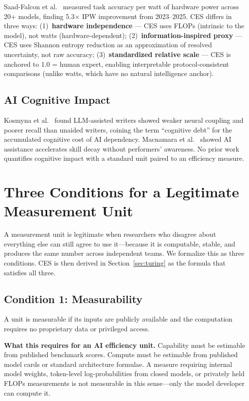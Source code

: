 \documentclass[12pt]{article}
\begin{document}
Saad-Falcon et al.\ \cite{saadfalcon2024} measured task accuracy per watt of hardware power across 20+ models, finding 5.3$\times$ IPW improvement from 2023--2025. CES differs in three ways: (1)~\textbf{hardware independence} --- CES uses FLOPs (intrinsic to the model), not watts (hardware-dependent); (2)~\textbf{information-inspired proxy} --- CES uses Shannon entropy reduction as an approximation of resolved uncertainty, not raw accuracy; (3)~\textbf{standardized relative scale} --- CES is anchored to 1.0 = human expert, enabling interpretable protocol-consistent comparisons (unlike watts, which have no natural intelligence anchor).

\subsection{AI Cognitive Impact}

Kosmyna et al.\ \cite{kosmyna2025} found LLM-assisted writers showed weaker neural coupling and poorer recall than unaided writers, coining the term ``cognitive debt'' for the accumulated cognitive cost of AI dependency. Macnamara et al.\ \cite{macnamara2024} showed AI assistance accelerates skill decay without performers' awareness. No prior work quantifies cognitive impact with a standard unit paired to an efficiency measure.


\section{Three Conditions for a Legitimate Measurement Unit}
\label{sec:conditions}

A measurement unit is legitimate when researchers who disagree about everything else can
still agree to use it---because it is computable, stable, and produces the same number
across independent teams. We formalize this as three conditions. CES is then derived in
Section~\ref{sec:turing} as the formula that satisfies all three.

\subsection{Condition 1: Measurability}

A unit is measurable if its inputs are publicly available and the computation requires no
proprietary data or privileged access.

\textbf{What this requires for an AI efficiency unit.} Capability must be estimable from
published benchmark scores. Compute must be estimable from published model cards or
standard architecture formulae. A measure requiring internal model weights, token-level
log-probabilities from closed models, or privately held FLOPs measurements is not
measurable in this sense---only the model developer can compute it.
\end{document}

